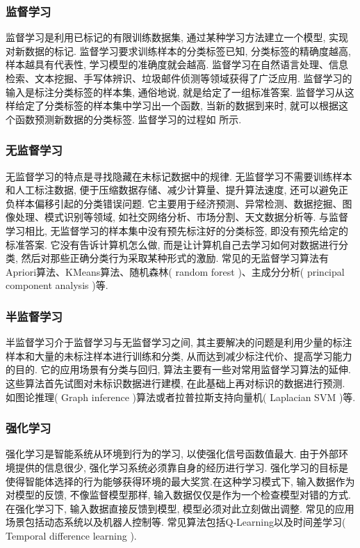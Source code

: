 \documentclass[lang=cn,11pt,a4paper]{elegantpaper}
\begin{document}
\subsubsection*{监督学习}
监督学习是利用已标记的有限训练数据集, 通过某种学习方法建立一个模型, 实现对新数据的标记. 监督学习要求训练样本的分类标签已知, 分类标签的精确度越高, 样本越具有代表性, 学习模型的准确度就会越高. 监督学习在自然语言处理、信息检索、文本挖掘、手写体辨识、垃圾邮件侦测等领域获得了广泛应用. 监督学习的输入是标注分类标签的样本集, 通俗地说, 就是给定了一组标准答案. 监督学习从这样给定了分类标签的样本集中学习出一个函数, 当新的数据到来时, 就可以根据这个函数预测新数据的分类标签. 监督学习的过程如 所示. 
\subsubsection*{无监督学习}
无监督学习的特点是寻找隐藏在未标记数据中的规律. 无监督学习不需要训练样本和人工标注数据, 便于压缩数据存储、减少计算量、提升算法速度, 还可以避免正负样本偏移引起的分类错误问题. 它主要用于经济预测、异常检测、数据挖掘、图像处理、模式识别等领域, 如社交网络分析、市场分割、天文数据分析等. 与监督学习相比, 无监督学习的样本集中没有预先标注好的分类标签, 即没有预先给定的标准答案. 它没有告诉计算机怎么做, 而是让计算机自己去学习如何对数据进行分类, 然后对那些正确分类行为采取某种形式的激励. 常见的无监督学习算法有Apriori算法、KMeans算法、随机森林( random forest )、主成分分析( principal component analysis )等. 

\subsubsection*{半监督学习}
半监督学习介于监督学习与无监督学习之间, 其主要解决的问题是利用少量的标注样本和大量的未标注样本进行训练和分类, 从而达到减少标注代价、提高学习能力的目的. 它的应用场景有分类与回归, 算法主要有一些对常用监督学习算法的延伸. 这些算法首先试图对未标识数据进行建模, 在此基础上再对标识的数据进行预测. 如图论推理( Graph inference )算法或者拉普拉斯支持向量机( Laplacian SVM )等. 
\subsubsection*{强化学习}
强化学习是智能系统从环境到行为的学习, 以使强化信号函数值最大. 由于外部环境提供的信息很少, 强化学习系统必须靠自身的经历进行学习. 强化学习的目标是使得智能体选择的行为能够获得环境的最大奖赏.在这种学习模式下, 输入数据作为对模型的反馈, 不像监督模型那样, 输入数据仅仅是作为一个检查模型对错的方式. 在强化学习下, 输入数据直接反馈到模型, 模型必须对此立刻做出调整. 常见的应用场景包括动态系统以及机器人控制等. 常见算法包括Q-Learning以及时间差学习( Temporal difference learning ). 
\end{document}
